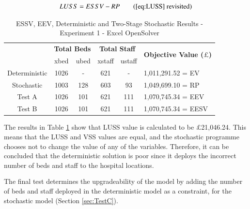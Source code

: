 \documentclass[../thesis.tex]{subfiles}
\begin{document}
\begin{equation}
    LUSS = ESSV - RP\tag{\ref{eq:LUSS} revisited}
\end{equation}

\begin{table}[h!]
    \centering
    \begin{tabular}{cccccl}\toprule
 & \multicolumn{2}{l}{\textbf{Total Beds}} & \multicolumn{2}{c}{\textbf{Total Staff}} & \multirow{2}{*}{\textbf{Objective Value ($\pounds$)}}\\ \cmidrule(lr){2-3} \cmidrule(lr){4-5}
 & xbed           & ubed          & xstaff         & ustaff         \\ \midrule
      Deterministic & 1026 & - &  621 & - & 1,011,291.52 =  EV \\ \midrule
      Stochastic & 1003 & 128  & 603 & 93 & 1,049,699.10 = RP\\ \midrule
      Test A & 1026 & 101 & 621&  111 &  1,070,745.34 = EEV\\\midrule
      Test B & 1026 & 101 & 621&  111 &  1,070,745.34 = EESV\\ \bottomrule
    \end{tabular}
    \caption{ESSV, EEV, Deterministic and Two-Stage Stochastic Results - Experiment 1 - Excel OpenSolver}
    \label{tab:eesveevdettwostageresults1}
\end{table}

The results in Table \ref{tab:eesveevdettwostageresults1} show that LUSS value is calculated to be $\pounds$21,046.24. This means that the LUSS and VSS values are equal, and the stochastic programme chooses not to change the value of any of the variables. Therefore, it can be concluded that the deterministic solution is poor since it deploys the incorrect number of beds and staff to the hospital locations.

The final test determines the upgradeability of the model by adding the number of beds and staff deployed in the deterministic model as a constraint, for the stochastic model (Section \ref{sec:TestC}). 
\end{document}
